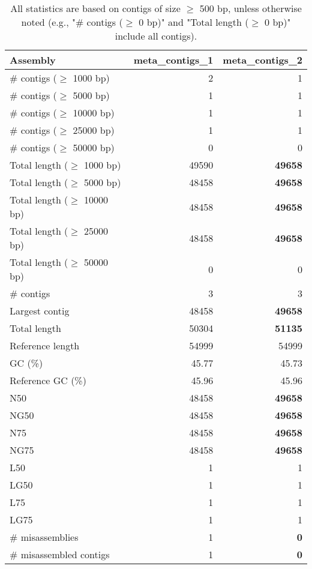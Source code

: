 \documentclass[12pt,a4paper]{article}
\begin{document}
\begin{table}[ht]
\begin{center}
\caption{All statistics are based on contigs of size $\geq$ 500 bp, unless otherwise noted (e.g., "\# contigs ($\geq$ 0 bp)" and "Total length ($\geq$ 0 bp)" include all contigs).}
\begin{tabular}{|l*{2}{|r}|}
\hline
Assembly & meta\_contigs\_1 & meta\_contigs\_2 \\ \hline
\# contigs ($\geq$ 1000 bp) & 2 & 1 \\ \hline
\# contigs ($\geq$ 5000 bp) & 1 & 1 \\ \hline
\# contigs ($\geq$ 10000 bp) & 1 & 1 \\ \hline
\# contigs ($\geq$ 25000 bp) & 1 & 1 \\ \hline
\# contigs ($\geq$ 50000 bp) & 0 & 0 \\ \hline
Total length ($\geq$ 1000 bp) & 49590 & {\bf 49658} \\ \hline
Total length ($\geq$ 5000 bp) & 48458 & {\bf 49658} \\ \hline
Total length ($\geq$ 10000 bp) & 48458 & {\bf 49658} \\ \hline
Total length ($\geq$ 25000 bp) & 48458 & {\bf 49658} \\ \hline
Total length ($\geq$ 50000 bp) & 0 & 0 \\ \hline
\# contigs & 3 & 3 \\ \hline
Largest contig & 48458 & {\bf 49658} \\ \hline
Total length & 50304 & {\bf 51135} \\ \hline
Reference length & 54999 & 54999 \\ \hline
GC (\%) & 45.77 & 45.73 \\ \hline
Reference GC (\%) & 45.96 & 45.96 \\ \hline
N50 & 48458 & {\bf 49658} \\ \hline
NG50 & 48458 & {\bf 49658} \\ \hline
N75 & 48458 & {\bf 49658} \\ \hline
NG75 & 48458 & {\bf 49658} \\ \hline
L50 & 1 & 1 \\ \hline
LG50 & 1 & 1 \\ \hline
L75 & 1 & 1 \\ \hline
LG75 & 1 & 1 \\ \hline
\# misassemblies & 1 & {\bf 0} \\ \hline
\# misassembled contigs & 1 & {\bf 0} \\ \hline

\end{tabular}
\end{center}
\end{table}
\end{document}
